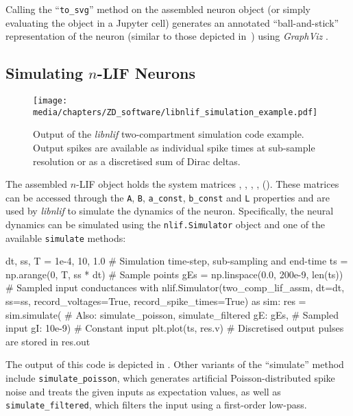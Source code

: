 Calling the \enquote{\texttt{to\_svg}} method on the assembled neuron object (or simply evaluating the object in a Jupyter cell) generates an annotated \enquote{ball-and-stick} representation of the neuron (similar to those depicted in~) using \emph{GraphViz} \citep{ellson2004graphviz}.

\subsection{Simulating $n$-LIF Neurons}

\begin{figure}
	\centering
	\texttt{[image: media/chapters/ZD\_software/libnlif\_simulation\_example.pdf]}
	\caption[Output of the \emph{libnlif} two-compartment LIF simulation code example]{Output of the \emph{libnlif} two-compartment \LIF simulation code example. Output spikes are available as individual spike times at sub-sample resolution or as a discretised sum of Dirac deltas.}
	\label{fig:libnlif_simulation_example}
\end{figure}

The assembled $n$-LIF object holds the system matrices \mnAp, \mnBp, \vnap, \vnbp, \mnL ().
These matrices can be accessed through the \texttt{A}, \texttt{B}, \texttt{a\_const}, \texttt{b\_const} and \texttt{L} properties and are used by \emph{libnlif} to simulate the dynamics of the neuron.
Specifically, the neural dynamics can be simulated using the \texttt{nlif.Simulator} object and one of the available \texttt{simulate} methods:
\begin{pythoncode}
dt, ss, T = 1e-4, 10, 1.0     # Simulation time-step, sub-sampling and end-time
ts = np.arange(0, T, ss * dt) # Sample points
gEs = np.linspace(0.0, 200e-9, len(ts)) # Sampled input conductances
with nlif.Simulator(two_comp_lif_assm, dt=dt, ss=ss,
                    record_voltages=True, record_spike_times=True) as sim:
	res = sim.simulate({      # Also: simulate_poisson, simulate_filtered
		gE: gEs,              # Sampled input
		gI: 10e-9})           # Constant input
plt.plot(ts, res.v)           # Discretised output pulses are stored in res.out
\end{pythoncode}
The output of this code is depicted in .
Other variants of the \enquote{simulate} method include \texttt{simulate\_poisson}, which generates artificial Poisson-distributed spike noise \citep[e.g.,][Section~1.4]{abbott2001theoretical} and treats the given inputs as expectation values, as well as \texttt{simulate\_filtered}, which filters the input using a first-order low-pass.

